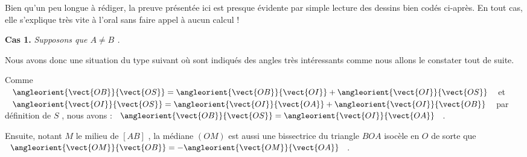 Bien qu'un peu longue à rédiger, la preuve présentée ici est presque évidente par simple lecture des dessins bien codés ci-après. En tout cas, elle s'explique très vite à l'oral sans faire appel à aucun calcul !


\bigskip


\textbf{Cas 1.} \emph{Supposons que $A \neq B$ .}

\medskip

Nous avons donc une situation du type suivant où sont indiqués des angles très intéressants comme nous allons le constater tout de suite.

\smallskip
\begin{center}
\end{center}
\smallskip

Comme 
$\angleorient{\vect{OB}}{\vect{OS}}
= \angleorient{\vect{OB}}{\vect{OI}}
+ \angleorient{\vect{OI}}{\vect{OS}}$
et
$\angleorient{\vect{OI}}{\vect{OS}}
= \angleorient{\vect{OI}}{\vect{OA}}
+ \angleorient{\vect{OI}}{\vect{OB}}$ 
par définition de $S$ , nous avons :
$\angleorient{\vect{OB}}{\vect{OS}}
= \angleorient{\vect{OI}}{\vect{OA}}$
.


\smallskip

Ensuite, notant $M$ le milieu de $[AB]$ , la médiane $(OM)$ est aussi une bissectrice du triangle $BOA$ isocèle en $O$ de sorte que
$\angleorient{\vect{OM}}{\vect{OB}} 
= - \angleorient{\vect{OM}}{\vect{OA}}$ 
.


